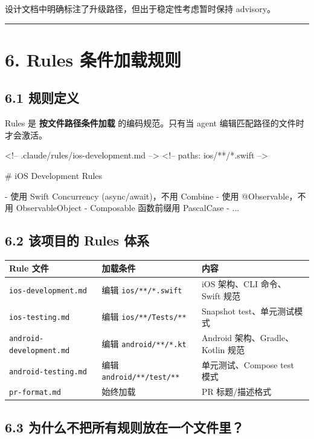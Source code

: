 设计文档中明确标注了升级路径，但出于稳定性考虑暂时保持 advisory。


\bigskip\hrule\bigskip

\section{6. Rules 条件加载规则}

\subsection{6.1 规则定义}

Rules 是 \textbf{按文件路径条件加载} 的编码规范。只有当 agent 编辑匹配路径的文件时才会激活。


\begin{codeblock}
<!-- .claude/rules/ios-development.md -->
<!-- paths: ios/**/*.swift -->

# iOS Development Rules

- 使用 Swift Concurrency (async/await)，不用 Combine
- 使用 @Observable，不用 ObservableObject
- Composable 函数前缀用 PascalCase
- ...
\end{codeblock}

\subsection{6.2 该项目的 Rules 体系}

\begingroup
\scriptsize
\setlength{\tabcolsep}{3pt}
\begin{longtable}{|p{}|p{}|p{}|}
\hline
Rule 文件 & 加载条件 & 内容 \\ \hline
\texttt{ios-development.md} & 编辑 \texttt{ios/**/*.swift} & iOS 架构、CLI 命令、Swift 规范 \\ \hline
\texttt{ios-testing.md} & 编辑 \texttt{ios/**/Tests/**} & Snapshot test、单元测试模式 \\ \hline
\texttt{android-development.md} & 编辑 \texttt{android/**/*.kt} & Android 架构、Gradle、Kotlin 规范 \\ \hline
\texttt{android-testing.md} & 编辑 \texttt{android/**/test/**} & 单元测试、Compose test 模式 \\ \hline
\texttt{pr-format.md} & 始终加载 & PR 标题/描述格式 \\ \hline
\end{longtable}
\endgroup

\subsection{6.3 为什么不把所有规则放在一个文件里？}

